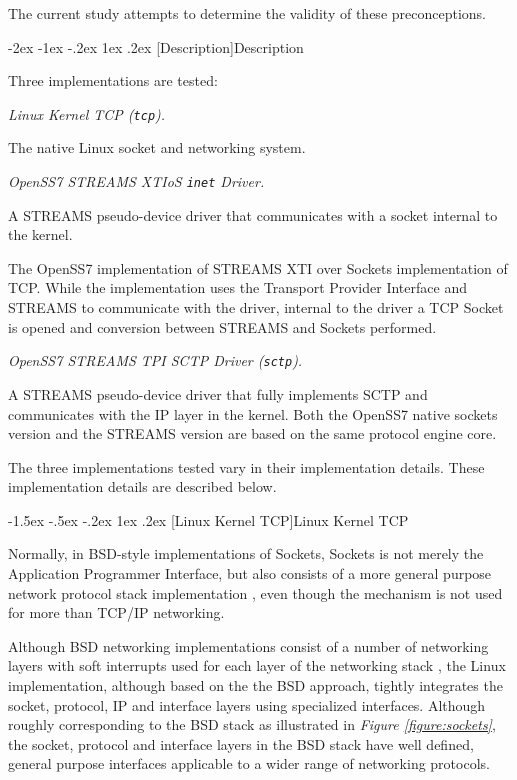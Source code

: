 \documentclass[letterpaper,final,notitlepage,twocolumn,10pt,twoside]{article}
\makeatletter
\let\large = \normalsize
\let\normalsize = \small
\let\small = \footnotesize
\let\footnotesize = \scriptsize
\let\scriptsize = \tiny
\renewcommand\section{\@startsection {section}{1}{\z@}%
                                   {-2ex \@plus -1ex \@minus -.2ex}%
                                   {1ex \@plus .2ex}%
                                   {\normalfont\large\bfseries}}
\renewcommand\subsection{\@startsection{subsection}{2}{\z@}%
                                     {-1.5ex \@plus -.5ex \@minus -.2ex}%
                                     {1ex \@plus .2ex}%
                                     {\normalfont\normalsize\bfseries}}
\makeatother
\begin{document}
The current study attempts to determine the validity of these preconceptions.

\section[Description]{Description}

Three implementations are tested:

\begin{description}

\item {\it Linux Kernel TCP ({\tt tcp}).}

The native Linux socket and networking system.

\item {\it OpenSS7 STREAMS XTIoS {\tt inet} Driver.}

A STREAMS pseudo-device driver that communicates with a socket internal to the kernel.

The OpenSS7 implementation of STREAMS XTI over Sockets implementation of TCP.  While the
implementation uses the Transport Provider Interface and STREAMS to communicate with the driver,
internal to the driver a TCP Socket is opened and conversion between STREAMS and Sockets performed.

\item {\it OpenSS7 STREAMS TPI SCTP Driver ({\tt sctp}).}

A STREAMS pseudo-device driver that fully implements SCTP and communicates with the IP layer in the
kernel.  Both the OpenSS7 native sockets version and the STREAMS version are based on the same
protocol engine core.

\end{description}

The three implementations tested vary in their implementation details.  These implementation details
are described below.

\subsection[Linux Kernel TCP]{Linux Kernel TCP}
\label{section:lktcp}

Normally, in BSD-style implementations of Sockets, Sockets is not merely the Application Programmer
Interface, but also consists of a more general purpose network protocol stack implementation
\cite[]{bsd}, even though the mechanism is not used for more than TCP/IP networking.  \cite[]{magic}

Although BSD networking implementations consist of a number of networking layers with soft
interrupts used for each layer of the networking stack \cite[]{bsd}, the Linux implementation,
although based on the the BSD approach, tightly integrates the socket, protocol, IP and interface
layers using specialized interfaces.  Although roughly corresponding to the BSD stack as illustrated
in \textit{Figure \ref{figure:sockets}}, the socket, protocol and interface layers in the BSD stack
have well defined, general purpose interfaces applicable to a wider range of networking protocols.
\end{document}
